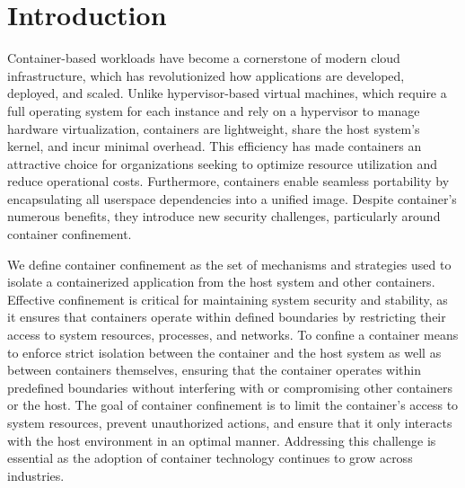 \section{Introduction}

Container-based workloads have become a cornerstone of modern cloud infrastructure, which has revolutionized how applications are developed, deployed, and scaled. Unlike hypervisor-based virtual machines, which require a full operating system for each instance and rely on a hypervisor to manage hardware virtualization, containers are lightweight, share the host system’s kernel, and incur minimal overhead. This efficiency has made containers an attractive choice for organizations seeking to optimize resource utilization and reduce operational costs. Furthermore, containers enable seamless portability by encapsulating all userspace dependencies into a unified image. Despite container's numerous benefits, they introduce new security challenges, particularly around container confinement. 

We define container confinement as the set of mechanisms and strategies used to isolate a containerized application from the host system and other containers. Effective confinement is critical for maintaining system security and stability, as it ensures that containers operate within defined boundaries by restricting their access to system resources, processes, and networks. To confine a container means to enforce strict isolation between the container and the host system as well as between containers themselves, ensuring that the container operates within predefined boundaries without interfering with or compromising other containers or the host. The goal of container confinement is to limit the container’s access to system resources, prevent unauthorized actions, and ensure that it only interacts with the host environment in an optimal manner. Addressing this challenge is essential as the adoption of container technology continues to grow across industries.


